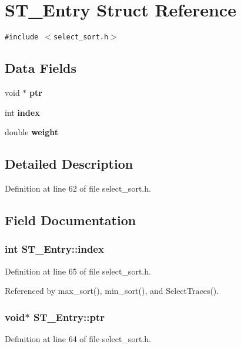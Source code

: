 \section{ST\_\-Entry Struct Reference}
\label{structST__Entry}
{\tt \#include $<$select\_\-sort.h$>$}

\subsection*{Data Fields}
\begin{CompactItemize}
\item 
void $\ast$ \bf{ptr}
\item 
int \bf{index}
\item 
double \bf{weight}
\end{CompactItemize}


\subsection{Detailed Description}




Definition at line 62 of file select\_\-sort.h.

\subsection{Field Documentation}
\subsubsection{\setlength{\rightskip}{0pt plus 5cm}int \bf{ST\_\-Entry::index}}\label{structST__Entry_9958026f4e0d627afa7423200ca63c66}




Definition at line 65 of file select\_\-sort.h.

Referenced by max\_\-sort(), min\_\-sort(), and Select\-Traces().
\subsubsection{\setlength{\rightskip}{0pt plus 5cm}void$\ast$ \bf{ST\_\-Entry::ptr}}\label{structST__Entry_fb1cefd63cb02cd25786d94e3d8a043d}




Definition at line 64 of file select\_\-sort.h.

